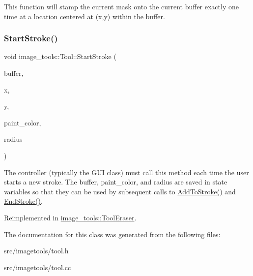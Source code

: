 This function will stamp the current mask onto the current buffer exactly one time at a location centered at (x,y) within the buffer. \mbox{\label{classimage__tools_1_1Tool_a1b7cd7d59588923d7e29b6150334f5b8}} 
\subsubsection{\texorpdfstring{Start\+Stroke()}{StartStroke()}}
{\footnotesize\ttfamily void image\+\_\+tools\+::\+Tool\+::\+Start\+Stroke (\begin{DoxyParamCaption}\item[{\hyperlink{classimage__tools_1_1PixelBuffer}{Pixel\+Buffer} $\ast$}]{buffer,  }\item[{int}]{x,  }\item[{int}]{y,  }\item[{const \hyperlink{classimage__tools_1_1ColorData}{Color\+Data} \&}]{paint\+\_\+color,  }\item[{float}]{radius }\end{DoxyParamCaption})\hspace{0.3cm}{\ttfamily [virtual]}}

The controller (typically the G\+UI class) must call this method each time the user starts a new stroke. The buffer, paint\+\_\+color, and radius are saved in state variables so that they can be used by subsequent calls to \hyperlink{classimage__tools_1_1Tool_a84d87d7baec8a961be236d4b30636fc0}{Add\+To\+Stroke()} and \hyperlink{classimage__tools_1_1Tool_aa76f5cae95ea7cdc30b067b84857a0f5}{End\+Stroke()}. 

Reimplemented in \hyperlink{classimage__tools_1_1ToolEraser_a5b00cd104c6fb0b34fa3f1f5165ab189}{image\+\_\+tools\+::\+Tool\+Eraser}.



The documentation for this class was generated from the following files\+:\begin{DoxyCompactItemize}
\item 
src/imagetools/tool.\+h\item 
src/imagetools/tool.\+cc\end{DoxyCompactItemize}
